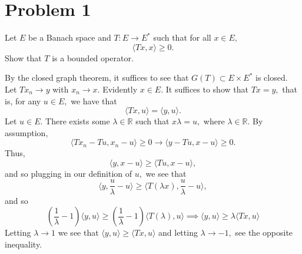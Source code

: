 \documentclass[11pt]{article}
\newcommand{\bbR}{\mathbb{R}}
\begin{document}
	
	
	\psetheader

\section*{Problem 1}

\begin{problem}
    Let $E$ be a Banach space and $T: E\to E^*$ such that for all $x\in E,$
    \[\langle Tx, x\rangle \geq 0.\] Show that $T$ is a bounded operator.
\end{problem}
\begin{solution}
By the closed graph theorem, it suffices to see that $G(T)\subset E \times E^*$ is closed. Let $Tx_n \to y$ with $x_n \to x.$ Evidently $x\in E.$ It suffices to show that $Tx = y,$ that is, for any $u\in E,$ 
we have that 
\[\langle T x, u \rangle = \langle y, u\rangle.\] Let $u \in E.$ There exists some $\lambda \in \bbR$ such that  $x\lambda = u,$ where $\lambda \in \bbR.$ By assumption,
\[\langle Tx_n - Tu, x_n - u\rangle \geq 0 \to \langle y - Tu, x-u\rangle \geq 0.\] Thus,
\[\langle y, x - u \rangle \geq \langle Tu, x-u\rangle,\] and so plugging in our definition of $u,$ we see that 
\[\langle y, \frac{u}{\lambda} - u\rangle \geq \langle T(\lambda x), \frac{u}{\lambda} - u\rangle,\] and so 
\[(\frac{1}{\lambda} -1)\langle y, u\rangle \geq (\frac{1}{\lambda} -1)\langle T(\lambda), u\rangle \implies \langle y, u\rangle \geq \lambda \langle Tx, u\rangle\] Letting $\lambda \to 1$ we see that $\langle y, u\rangle \geq \langle Tx, u\rangle$ and letting $\lambda \to -1,$ see the opposite inequality.
\end{solution}

\newpage
\end{document}
